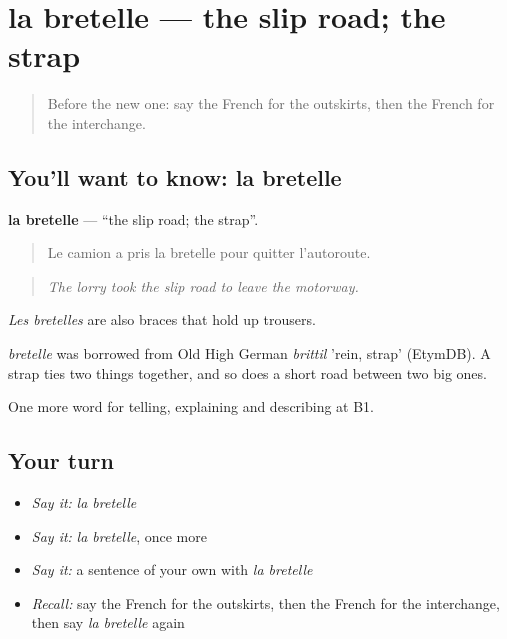\section[la bretelle]{la bretelle — the slip road; the strap}

\label{lesson:FR-C400-bretelle}



\begin{quote}
Before the new one: say the French for the outskirts, then the French for the interchange.
\end{quote}

\subsection*{You'll want to know: la bretelle}
\textbf{la bretelle} — \textquotedblleft{}the slip road; the strap\textquotedblright{}.

\begin{quote}
Le camion a pris la bretelle pour quitter l'autoroute.
\end{quote}

\begin{quote}
\emph{The lorry took the slip road to leave the motorway.}
\end{quote}

\emph{Les bretelles} are also braces that hold up trousers.

\begin{cousinweb}
\emph{bretelle} was borrowed from Old High German \emph{brittil} 'rein, strap' (EtymDB). A strap ties two things together, and so does a short road between two big ones.
\end{cousinweb}

\begin{grammarlens}[title={What you've built}]
One more word for telling, explaining and describing at B1.
\end{grammarlens}

\subsection*{Your turn}
\begin{itemize}
\raggedright
  \item \emph{Say it:} \emph{la bretelle}
  \item \emph{Say it:} \emph{la bretelle}, once more
  \item \emph{Say it:} a sentence of your own with \emph{la bretelle}
  \item \emph{Recall:} say the French for the outskirts, then the French for the interchange, then say \emph{la bretelle} again
\end{itemize}

